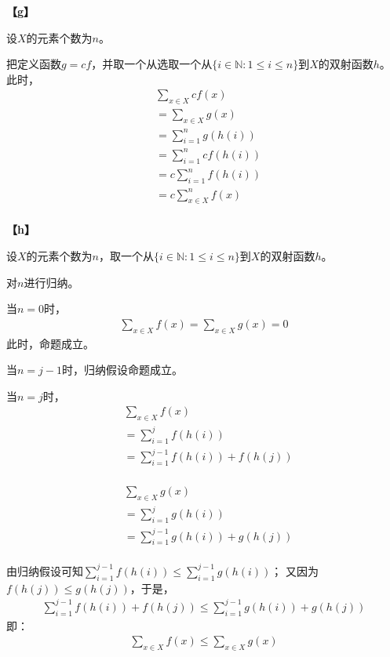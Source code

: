 \documentclass{article}
\theoremstyle{mystyle}
\begin{document}
\textbf{【g】}

设$X$的元素个数为$n$。

把定义函数$g = cf$，并取一个从选取一个从$\{i \in \mathbb{N}: 1 \leq i \leq n\}$到$X$的双射函数$h$。
此时，
\begin{align*}
         & \sum \limits_{x \in X} cf(x)       \\
         & = \sum \limits_{x \in X} g(x)      \\
         & = \sum \limits_{i = 1}^n g(h(i))   \\
         & = \sum \limits_{i = 1}^n cf(h(i))  \\
         & = c \sum \limits_{i = 1}^n f(h(i)) \\
         & = c \sum \limits_{x \in X}^n f(x)  \\
\end{align*}

\textbf{【h】}

设$X$的元素个数为$n$，取一个从$\{i \in \mathbb{N}: 1 \leq i \leq n\}$到$X$的双射函数$h$。

对$n$进行归纳。

当$n = 0$时，
\begin{align*}
        \sum \limits_{x \in X} f(x) = \sum \limits_{x \in X} g(x) = 0
\end{align*}
此时，命题成立。

当$n=j-1$时，归纳假设命题成立。

当$n=j$时，
\begin{align*}
         & \sum \limits_{x \in X} f(x)                    \\
         & = \sum \limits_{i = 1}^j f(h(i))               \\
         & = \sum \limits_{i = 1}^{j-1} f(h(i)) + f(h(j)) \\
\end{align*}

\begin{align*}
         & \sum \limits_{x \in X} g(x)                    \\
         & = \sum \limits_{i = 1}^j g(h(i))               \\
         & = \sum \limits_{i = 1}^{j-1} g(h(i)) + g(h(j)) \\
\end{align*}

由归纳假设可知$\sum \limits_{i = 1}^{j-1} f(h(i)) \leq \sum \limits_{i = 1}^{j-1} g(h(i))$；
又因为$f(h(j)) \leq g(h(j))$，于是，
\begin{align*}
        \sum \limits_{i = 1}^{j-1} f(h(i)) + f(h(j)) \leq \sum \limits_{i = 1}^{j-1} g(h(i)) + g(h(j))
\end{align*}
即：
\begin{align*}
        \sum \limits_{x \in X} f(x) \leq \sum \limits_{x \in X} g(x)
\end{align*}
\end{document}
